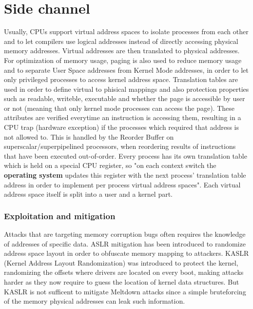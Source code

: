\section{Side channel}
Usually, CPUs support virtual address spaces to isolate processes from each other and to let
compilers use logical addresses instead of directly accessing physical memory addresses.
Virtual addresses are then translated to physical addresses. For optimization of memory usage, paging is also used
to reduce memory usage and to separate User Space addresses from Kernel Mode addresses,
in order to let only privileged processes to access kernel address space. Translation tables are used in order to define virtual to phisical mappings
and also protection properties such as readable, writeble, executable and whether the page is accessible by
user or not (meaning that only kernel mode processes can access the page).
These attributes are verified everytime an instruction is accessing them, resulting in a CPU trap (hardware exception) if the processes
which required that address is not allowed to. This is handled by the Reorder Buffer on superscalar/superpipelined processors, when reordering results
of instructions that have been executed out-of-order.
Every process has its own translation table which is held on a special CPU register, so "on each context switch the \textbf{operating system} updates
this register with the next process' translation table address in order to implement per process virtual address spaces".
Each virtual address space itself is split into a user and a kernel part.

\subsubsection{Exploitation and mitigation}
Attacks that are targeting memory corruption bugs often requires the knowledge of addresses of specific data.
ASLR mitigation has been introduced to randomize address space layout in order to obfuscate memory mapping to
attackers. KASLR (Kernel Address Layout Randomization) was introduced to protect the kernel, randomizing the offsets where
drivers are located on every boot, making attacks harder as they now require to guess the location of kernel data structures.
But KASLR is not sufficent to mitigate Meltdown attacks since a simple bruteforcing of the memory physical addresses can leak
such information.

